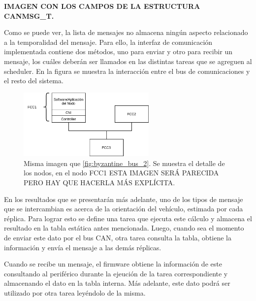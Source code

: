 {\Large \textbf{{\color{red} IMAGEN CON LOS CAMPOS DE LA ESTRUCTURA CANMSG\_T.}}}

Como se puede ver, la lista de mensajes no almacena ningún aspecto relacionado a la temporalidad del mensaje. Para ello, la interfaz de comunicación implementada contiene dos métodos, uno para enviar y otro para recibir un mensaje, los cuáles deberán ser llamados en las distintas tareas que se agreguen al scheduler. En la figura  se muestra la interacción entre el bus de comunicaciones y el resto del sistema.


\begin{figure}[H]
    \centering
    \includegraphics[width=0.6\textwidth]{img/TTA_Bus.png}
    \caption{Misma imagen que \ref{fig:byzantine_bus_2}. Se muestra el detalle de los nodos, en el nodo FCC1 {\color{red} ESTA IMAGEN SERÁ PARECIDA PERO HAY QUE HACERLA MÁS EXPLÍCITA}.}
    \label{fig:TTA_Bus}
\end{figure}

En los resultados que se presentarán más adelante, uno de los tipos de mensaje que se intercambian es acerca de la orientación del vehículo, estimada por cada réplica. Para lograr esto se define una tarea que ejecuta este cálculo y almacena el resultado en la tabla estática antes mencionada. Luego, cuando sea el momento de enviar este dato por el bus CAN, otra tarea consulta la tabla, obtiene la información y envía el mensaje a las demás réplicas. 

Cuando se recibe un mensaje, el firmware obtiene la información de este consultando al periférico durante la ejeución de la tarea correspondiente y almacenando el dato en la tabla interna. Más adelante, este dato podrá ser utilizado por otra tarea leyéndolo de la misma.

